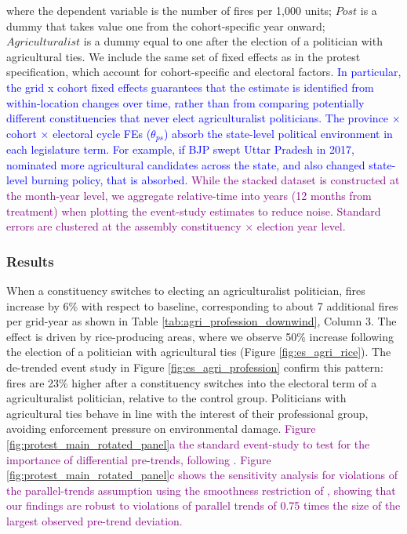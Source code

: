 \documentclass[12pt]{article}
\begin{document}
where the dependent variable is the number of fires per 1,000 units; $Post$ is a dummy that takes value one from the cohort-specific year onward; $Agriculturalist$ is a dummy equal to one after the election of a politician with agricultural ties. We include the same set of fixed effects as in the protest specification, which account for cohort-specific and electoral factors. \textcolor{blue}{In particular, the grid x cohort fixed effects guarantees that the estimate is identified from within-location changes over time, rather than from comparing potentially different constituencies that never elect agriculturalist politicians. The province × cohort × electoral cycle FEs ($\theta_{ps}$) absorb the state-level political environment in each legislature term. For example, if BJP swept Uttar Pradesh in 2017, nominated more agricultural candidates across the state, and also changed state-level burning policy, that is absorbed. 
}
 \textcolor{purple}{While the stacked dataset is constructed at the month-year level, we aggregate relative-time into years (12 months from treatment) when plotting the event-study estimates to reduce noise.
Standard errors are clustered at the assembly constituency $\times$ election year level.}

\subsubsection{Results\label{sssec:results3}}


When a constituency switches to electing an agriculturalist politician, fires increase by 6\% with respect to baseline, corresponding to about 7 additional fires per grid-year as shown in Table \ref{tab:agri_profession_downwind}, Column 3. The effect is driven by rice-producing areas, where we observe 50\% increase following the election of a politician with agricultural ties  (Figure \ref{fig:es_agri_rice}). The de-trended event study in Figure \ref{fig:es_agri_profession} confirm this pattern:  fires are 23\% higher after a constituency switches into the electoral term of a agriculturalist politician, relative to the control group. Politicians with agricultural ties behave in line with the interest of their professional group, avoiding enforcement pressure on environmental damage.
\textcolor{purple}{Figure \ref{fig:protest_main_rotated_panel}a the standard event-study to test for the importance of differential pre-trends, following \citet{dustmann2022reallocation}. Figure \ref{fig:protest_main_rotated_panel}c shows the sensitivity analysis for violations of the parallel-trends assumption using the smoothness restriction of \citet{rambachan2023more}, showing that our findings are robust to violations of parallel trends of 0.75 times the size of the largest observed pre-trend deviation.}
\end{document}
